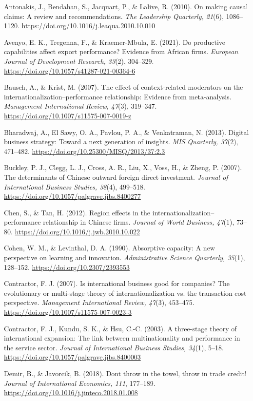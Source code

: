 \documentclass[12pt,a4paper]{article}
\begin{document}
Antonakis, J., Bendahan, S., Jacquart, P., \& Lalive, R. (2010). On
making causal claims: A review and recommendations. \emph{The Leadership
Quarterly, 21}(6), 1086--1120.
\url{https://doi.org/10.1016/j.leaqua.2010.10.010}

Avenyo, E. K., Tregenna, F., \& Kraemer-Mbula, E. (2021). Do productive
capabilities affect export performance? Evidence from African firms.
\emph{European Journal of Development Research, 33}(2), 304--329.
\url{https://doi.org/10.1057/s41287-021-00364-6}

Bausch, A., \& Krist, M. (2007). The effect of context-related
moderators on the internationalization--performance relationship:
Evidence from meta-analysis. \emph{Management International Review,
47}(3), 319--347. \url{https://doi.org/10.1007/s11575-007-0019-z}

Bharadwaj, A., El Sawy, O. A., Pavlou, P. A., \& Venkatraman, N. (2013).
Digital business strategy: Toward a next generation of insights.
\emph{MIS Quarterly, 37}(2), 471--482.
\url{https://doi.org/10.25300/MISQ/2013/37:2.3}

Buckley, P. J., Clegg, L. J., Cross, A. R., Liu, X., Voss, H., \& Zheng,
P. (2007). The determinants of Chinese outward foreign direct
investment. \emph{Journal of International Business Studies, 38}(4),
499--518. \url{https://doi.org/10.1057/palgrave.jibs.8400277}

Chen, S., \& Tan, H. (2012). Region effects in the
internationalization--performance relationship in Chinese firms.
\emph{Journal of World Business, 47}(1), 73--80.
\url{https://doi.org/10.1016/j.jwb.2010.10.022}

Cohen, W. M., \& Levinthal, D. A. (1990). Absorptive capacity: A new
perspective on learning and innovation. \emph{Administrative Science
Quarterly, 35}(1), 128--152. \url{https://doi.org/10.2307/2393553}

Contractor, F. J. (2007). Is international business good for companies?
The evolutionary or multi-stage theory of internationalization vs. the
transaction cost perspective. \emph{Management International Review,
47}(3), 453--475. \url{https://doi.org/10.1007/s11575-007-0023-3}

Contractor, F. J., Kundu, S. K., \& Hsu, C.-C. (2003). A three-stage
theory of international expansion: The link between multinationality and
performance in the service sector. \emph{Journal of International
Business Studies, 34}(1), 5--18.
\url{https://doi.org/10.1057/palgrave.jibs.8400003}

Demir, B., \& Javorcik, B. (2018). Don\textquotesingle t throw in the
towel, throw in trade credit! \emph{Journal of International Economics,
111}, 177--189. \url{https://doi.org/10.1016/j.jinteco.2018.01.008}
\end{document}
